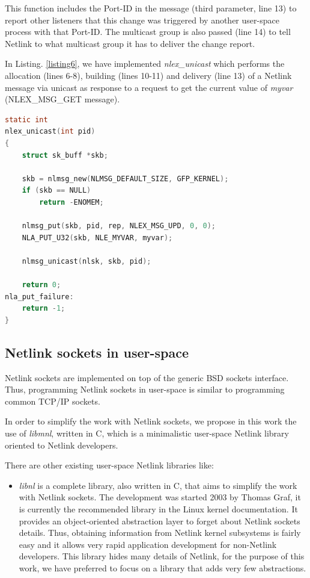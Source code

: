 \documentclass[10pt,onecolumn]{article}
\begin{document}
This function includes the Port-ID in the message (third parameter, line 13) to report other listeners that this change was triggered by another user-space process with that Port-ID. The multicast group is also passed (line 14) to tell Netlink to what multicast group it has to deliver the change report.

In Listing. \ref{listing6}, we have implemented \textit{nlex\_unicast} which performs the allocation (lines 6-8), building (lines 10-11) and delivery (line 13) of a Netlink message via unicast as response to a request to get the current value of \textit{myvar} (NLEX\_MSG\_GET message).

\begin{lstlisting}[language=C, caption=Unicast delivery to obtain the value of \textit{myvar}, label=listing6]
static int
nlex_unicast(int pid)
{
    struct sk_buff *skb;

    skb = nlmsg_new(NLMSG_DEFAULT_SIZE, GFP_KERNEL);
    if (skb == NULL)
        return -ENOMEM;

    nlmsg_put(skb, pid, rep, NLEX_MSG_UPD, 0, 0);
    NLA_PUT_U32(skb, NLE_MYVAR, myvar);

    nlmsg_unicast(nlsk, skb, pid);

    return 0;
nla_put_failure:
    return -1;
}
\end{lstlisting}

\subsection{Netlink sockets in user-space}
Netlink sockets are implemented on top of the generic BSD sockets interface. Thus, programming Netlink sockets in user-space is similar to programming common TCP/IP sockets.

In order to simplify the work with Netlink sockets, we propose in this work the use of \textit{libmnl}, written in C, which is a minimalistic user-space Netlink library oriented to Netlink developers.

There are other existing user-space Netlink libraries like:

\begin{itemize}
  \item \textit{libnl} is a complete library, also written in C, that aims to simplify the work with Netlink sockets. The development was started 2003 by Thomas Graf, it is currently the recommended library in the Linux kernel documentation. It provides an object-oriented abstraction layer to forget about Netlink sockets details. Thus, obtaining information from Netlink kernel subsystems is fairly easy and it allows very rapid application development for non-Netlink developers. This library hides many details of Netlink, for the purpose of this work, we have preferred to focus on a library that adds very few abstractions.
\end{itemize}
\end{document}
